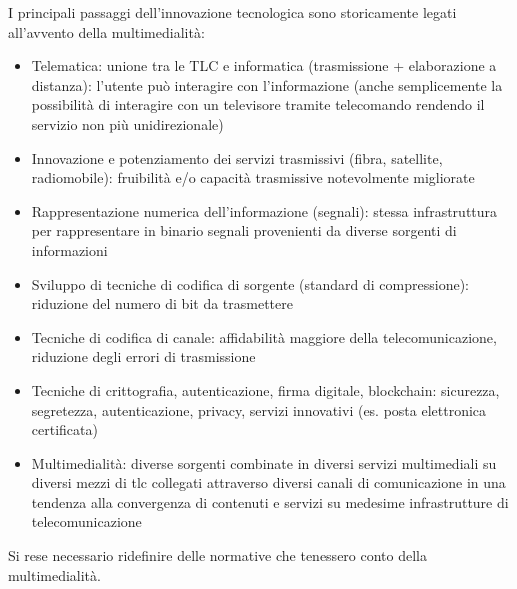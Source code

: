 I principali passaggi dell'innovazione tecnologica sono storicamente legati all'avvento della multimedialità:
\begin{itemize}
    \item Telematica: unione tra le TLC e informatica (trasmissione + elaborazione a distanza): l'utente può interagire con l'informazione (anche semplicemente la possibilità di interagire con un televisore tramite telecomando rendendo il servizio non più unidirezionale)
    \item Innovazione e potenziamento dei servizi trasmissivi (fibra, satellite, radiomobile): fruibilità e/o capacità trasmissive notevolmente migliorate
    \item Rappresentazione numerica dell'informazione (segnali): stessa infrastruttura per rappresentare in binario segnali provenienti da diverse sorgenti di informazioni
    \item Sviluppo di tecniche di codifica di sorgente (standard di compressione): riduzione del numero di bit da trasmettere
    \item Tecniche di codifica di canale: affidabilità maggiore della telecomunicazione, riduzione degli errori di trasmissione
    \item Tecniche di crittografia, autenticazione, firma digitale, blockchain: sicurezza, segretezza, autenticazione, privacy, servizi innovativi (es. posta elettronica certificata)
    \item Multimedialità: diverse sorgenti combinate in diversi servizi multimediali su diversi mezzi di tlc collegati attraverso diversi canali di comunicazione in una tendenza alla convergenza di contenuti e servizi su medesime infrastrutture di telecomunicazione
\end{itemize}

Si rese necessario ridefinire delle normative che tenessero conto della multimedialità. 
